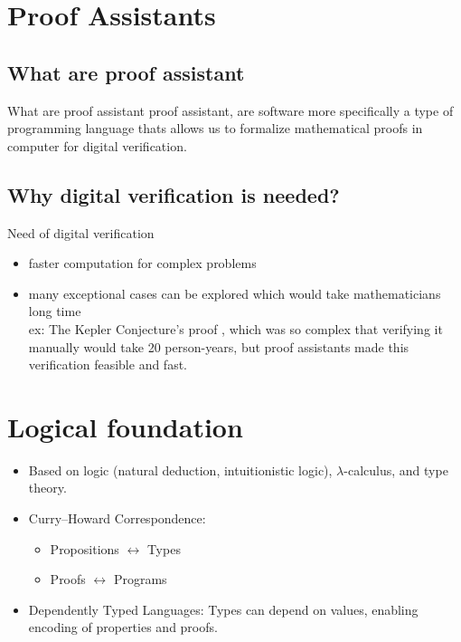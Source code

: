 \documentclass[aspectratio=169, compress, 12pt]{beamer}
\begin{document}
\TitlePage        
\SectionPage    
\SubsectionPage    %
\ProgressBar       %
\PageNumbering     %


     

\section{Proof Assistants} 
\subsection*{What are proof assistant}
\begin{frame}{What are proof assistant}
    proof assistant, are software more specifically a type of programming language thats allows us to 
    formalize mathematical proofs in computer for digital verification. 
\end{frame}
\subsection*{Why digital verification is needed?}
\begin{frame}{Need of digital verification}
    \begin{itemize}
        \item faster computation for complex problems
        \item many exceptional cases can be explored which would take mathematicians  long time \\
           \indent  \footnotesize ex:   The Kepler Conjecture's proof , which was so complex that verifying it manually would take 20 person-years, but proof assistants made this verification feasible and fast. 
    \end{itemize}
\end{frame}
\section{Logical foundation}
\begin{frame}
    \begin{itemize}
    \item Based on logic (natural deduction, intuitionistic logic), $\lambda$-calculus, and type theory.
    \item Curry–Howard Correspondence:
    \begin{itemize}
        \item Propositions $\leftrightarrow$ Types
        \item Proofs $\leftrightarrow$ Programs
    \end{itemize}
    \item Dependently Typed Languages: Types can depend on values, enabling encoding of properties and proofs.
\end{itemize}
\end{frame}
\end{document}
